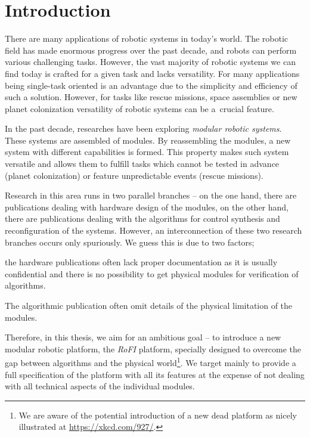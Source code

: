 \chapter{Introduction}\label{chap:introduction}

There are many applications of robotic systems in today's world. The robotic
field has made enormous progress over the past decade, and robots can perform
various challenging tasks. However, the vast majority of robotic systems we can
find today is crafted for a given task and lacks versatility. For many
applications being single-task oriented is an advantage due to the simplicity
and efficiency of such a solution. However, for tasks like rescue missions,
space assemblies or new planet colonization versatility of robotic systems can
be a~crucial feature.

In the past decade, researches have been exploring \emph{modular robotic
systems}. These systems are assembled of modules. By reassembling the modules, a
new system with different capabilities is formed. This property makes such
system versatile and allows them to fulfill tasks which cannot be tested in
advance (planet colonization) or feature unpredictable events (rescue missions).

Research in this area runs in two parallel branches -- on the one hand, there
are publications dealing with hardware design of the modules, on the other hand,
there are publications dealing with the algorithms for control synthesis and
reconfiguration of the systems. However, an interconnection of these two
research branches occurs only spuriously. We guess this is due to two factors;
\begin{enumerate*}
    \item the hardware publications often lack proper documentation as it is
    usually confidential and there is no possibility to get physical modules for
    verification of algorithms.
    \item The algorithmic publication often omit details of the physical
    limitation of the modules.
\end{enumerate*}

Therefore, in this thesis, we aim for an ambitious goal -- to introduce a new
modular robotic platform, the \emph{RoFI} platform, specially designed to
overcome the gap between algorithms and the physical world\footnote{We are aware
of the potential introduction of a new dead platform as nicely illustrated at
\url{https://xkcd.com/927/}.}. We target mainly to provide a full specification
of the platform with all its features at the expense of not dealing with all
technical aspects of the individual modules.

